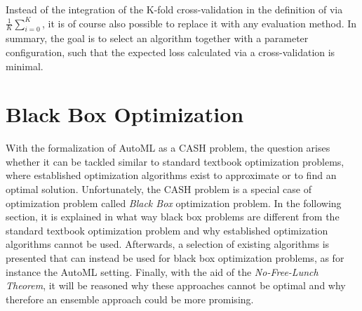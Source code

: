 Instead of the integration of the K-fold cross-validation in the definition of \citeauthor{Thornton-AutoWeka} via $\frac{1}{K} \sum_{i=0}^K$, it is of course also possible to replace it with any evaluation method.\newline
In summary, the goal is to select an algorithm together with a parameter configuration, such that the expected loss calculated via a cross-validation is minimal.

\section{Black Box Optimization}
\label{sec:theory:optimization}
With the formalization of AutoML as a CASH problem, the question arises whether it can be tackled similar to standard textbook optimization problems, where established optimization algorithms exist to approximate or to find an optimal solution.
Unfortunately, the CASH problem is a special case of optimization problem called \textit{Black Box} optimization problem.\newline
In the following section, it is explained in what way black box problems are different from the standard textbook optimization problem and why established optimization algorithms cannot be used.
Afterwards, a selection of existing algorithms is presented that can instead be used for black box optimization problems, as for instance the AutoML setting.
Finally, with the aid of the \textit{No-Free-Lunch Theorem}, it will be reasoned why these approaches cannot be optimal and why therefore an ensemble approach could be more promising.

